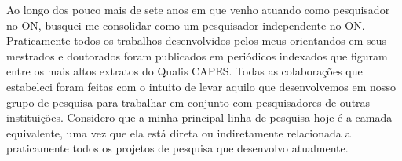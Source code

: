 Ao longo dos pouco mais de sete anos em que venho atuando como pesquisador no ON, 
busquei me consolidar como um pesquisador independente no ON. 
Praticamente todos os trabalhos desenvolvidos pelos meus orientandos em seus 
mestrados e doutorados foram publicados em periódicos indexados que figuram entre 
os mais altos extratos do Qualis CAPES.
Todas as colaborações que estabeleci foram feitas com o intuito de levar aquilo que 
desenvolvemos em nosso grupo de pesquisa para trabalhar em conjunto com pesquisadores 
de outras instituições. 
Considero que a minha principal linha de pesquisa hoje é a camada equivalente,
uma vez que ela está direta ou indiretamente relacionada a praticamente todos os 
projetos de pesquisa que desenvolvo atualmente. 






